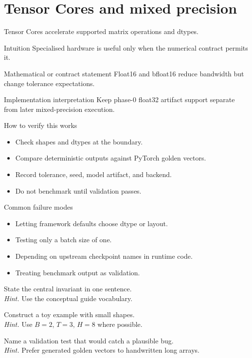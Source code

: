 \chapter{Tensor Cores and mixed precision}
\label{ch:tensor-cores}
Tensor Cores accelerate supported matrix operations and dtypes. \citep{cudaProgrammingGuide,cutlassDocs}



\begin{intuitionbox}{Intuition}
Specialised hardware is useful only when the numerical contract permits it.
\end{intuitionbox}

\begin{definitionbox}{Mathematical or contract statement}
Float16 and bfloat16 reduce bandwidth but change tolerance expectations.
\end{definitionbox}

\begin{implementationbox}{Implementation interpretation}
Keep phase-0 float32 artifact support separate from later mixed-precision execution.
\end{implementationbox}

\begin{verificationbox}{How to verify this works}
\begin{itemize}
\item Check shapes and dtypes at the boundary.
\item Compare deterministic outputs against PyTorch golden vectors.
\item Record tolerance, seed, model artifact, and backend.
\item Do not benchmark until validation passes.
\end{itemize}
\end{verificationbox}

\begin{warningbox}{Common failure modes}
\begin{itemize}
\item Letting framework defaults choose dtype or layout.
\item Testing only a batch size of one.
\item Depending on upstream checkpoint names in runtime code.
\item Treating benchmark output as validation.
\end{itemize}
\end{warningbox}

\begin{chapterexercises}
\item State the central invariant in one sentence.\\
\textit{Hint.} Use the conceptual guide vocabulary.
\item Construct a toy example with small shapes.\\
\textit{Hint.} Use $B=2$, $T=3$, $H=8$ where possible.
\item Name a validation test that would catch a plausible bug.\\
\textit{Hint.} Prefer generated golden vectors to handwritten long arrays.
\end{chapterexercises}

